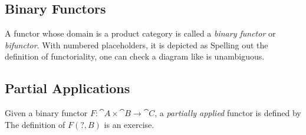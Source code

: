 \subsection{Binary Functors}

A functor whose domain is a product category
is called a \textit{binary functor} or \textit{bifunctor}. With numbered placeholders, it is depicted as
Spelling out the definition of functoriality, one can check a diagram like
is unambiguous.

\subsection{Partial Applications}

Given a binary functor $F : \cat{A} \times \cat{B} \to \cat{C}$, a \textit{partially applied} functor
is defined by
The definition of $F(\texttt{?},B)$ is an exercise. 



